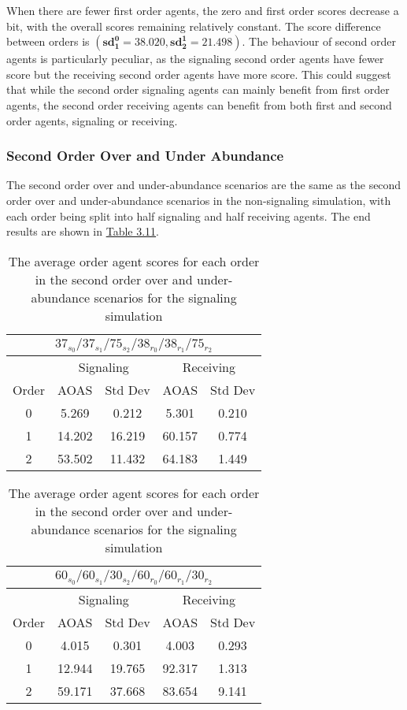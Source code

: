 When there are fewer first order agents, the zero and first order scores decrease a bit, with the overall scores remaining relatively constant. The score difference between orders is $(\mathbf{sd^0_1 = 38.020}, \mathbf{sd^1_2 = 21.498})$. The behaviour of second order agents is particularly peculiar, as the signaling second order agents have fewer score but the receiving second order agents have more score. This could suggest that while the second order signaling agents can mainly benefit from first order agents, the second order receiving agents can benefit from both first and second order agents, signaling or receiving.

\subsubsection{Second Order Over and Under Abundance}

The second order over and under-abundance scenarios are the same as the second order over and under-abundance scenarios in the non-signaling simulation, with each order being split into half signaling and half receiving agents. The end results are shown in \hyperref[table:sig-second-order-simple]{Table 3.11}.

\begin{table}[h]
    \centering
    \begin{tabular}{|c|c|c|c|c|}
    \hline
    \multicolumn{5}{|c|}{$37_{s_{0}}/37_{s_{1}}/75_{s_{2}}/38_{r_{0}}/38_{r_{1}}/75_{r_{2}}$} \\
    \hline
    \multicolumn{1}{|c|}{} & \multicolumn{2}{|c|}{Signaling} & \multicolumn{2}{|c|}{Receiving} \\
    \hline
    Order & AOAS & Std Dev & AOAS & Std Dev \\
    \hline
    0     & 5.269    & 0.212     & 5.301     & 0.210   \\
    1     & 14.202   & 16.219    & 60.157    & 0.774   \\
    2     & 53.502   & 11.432    & 64.183    & 1.449   \\
    \hline
    \end{tabular}
    \qquad
    \begin{tabular}{|c|c|c|c|c|}
    \hline
    \multicolumn{5}{|c|}{$60_{s_{0}}/60_{s_{1}}/30_{s_{2}}/60_{r_{0}}/60_{r_{1}}/30_{r_{2}}$} \\
    \hline
    \multicolumn{1}{|c|}{} & \multicolumn{2}{|c|}{Signaling} & \multicolumn{2}{|c|}{Receiving} \\
    \hline
    Order & AOAS & Std Dev & AOAS & Std Dev \\
    \hline
    0     & 4.015   & 0.301    & 4.003   & 0.293   \\
    1     & 12.944  & 19.765   & 92.317  & 1.313   \\
    2     & 59.171  & 37.668   & 83.654  & 9.141   \\
    \hline
    \end{tabular}
    \caption{The average order agent scores for each order in the second order over and under-abundance scenarios for the signaling simulation}
    \label{table:sig-second-order-simple}
\end{table}
    
